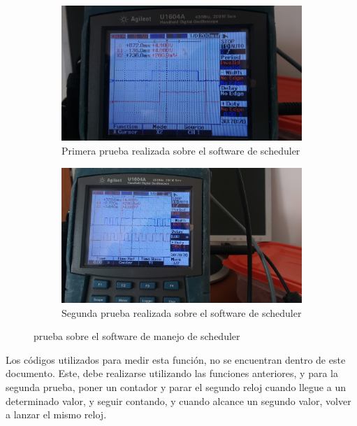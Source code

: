 \begin{figure}[ht]
	\begin{subfigure}{0.5\linewidth}
		\centering
		\includegraphics[width=\linewidth]{osciloscopio_im1} 
		\caption{Primera prueba realizada sobre el software de scheduler}
		\label{fig:osc_m1}	
	\end{subfigure}
	\hfill
	\begin{subfigure}{0.5\linewidth}
		\centering
		\includegraphics[width=\linewidth]{osciloscopio_im2}
		\caption{Segunda prueba realizada sobre el software de scheduler} 
		\label{fig:osc_m2}		
	\end{subfigure}
	\caption{prueba sobre el software de manejo de scheduler}
\end{figure}

Los códigos utilizados para medir esta función, no se encuentran dentro de este documento. Este, debe realizarse utilizando las funciones anteriores, y para la segunda prueba, poner un contador y parar el segundo reloj cuando llegue a un determinado valor, y seguir contando, y cuando alcance un segundo valor, volver a lanzar el mismo reloj. 

